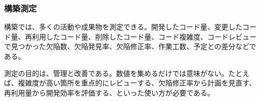 \subsubsection{構築測定}

構築では、多くの活動や成果物を測定できる。開発したコード量、変更したコード量、再利用したコード量、削除したコード量、コード複雑度、コードレビューで見つかった欠陥数、欠陥発見率、欠陥修正率、作業工数、予定との差分などである。

測定の目的は、管理と改善である。数値を集めるだけでは意味がない。たとえば、複雑度が高い箇所を重点的にレビューする、欠陥修正率から計画を見直す、再利用量から開発効率を評価する、といった使い方が必要である。
